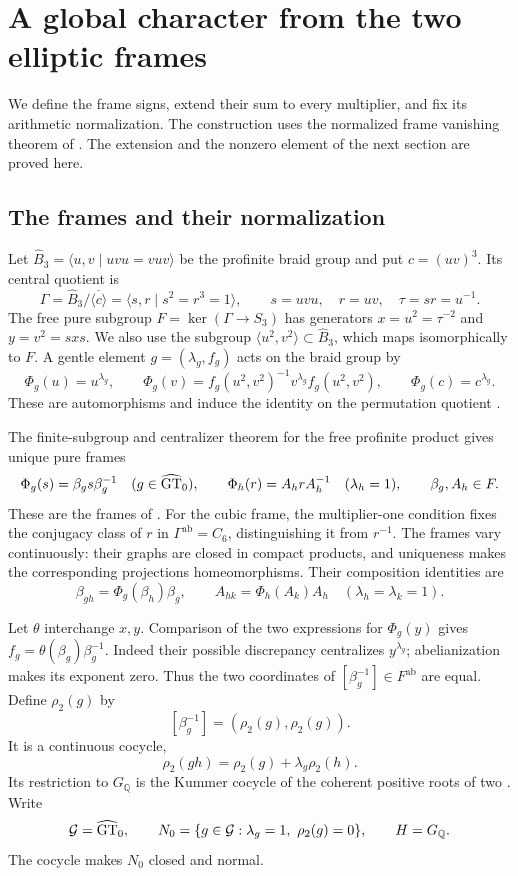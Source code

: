 \section{A global character from the two elliptic frames}
\label{sec:global-frame-character}

We define the frame signs, extend their sum to every multiplier, and
fix its arithmetic normalization. The construction uses the normalized
frame vanishing theorem of \cite[Theorem~3]{H17}. The extension and
the nonzero element of the next section are proved here.

\subsection{The frames and their normalization}

Let $\widehat B_3=\langle u,v\mid uvu=vuv\rangle$ be the profinite
braid group and put $c=(uv)^3$. Its central quotient is
\[
 \Gamma=\widehat B_3/\overline{\langle c\rangle}
      =\langle s,r\mid s^2=r^3=1\rangle,
 \qquad s=uvu,\quad r=uv,\quad \tau=sr=u^{-1}.
\]
The free pure subgroup $F=\ker(\Gamma\to S_3)$ has generators
$x=u^2=\tau^{-2}$ and $y=v^2=sxs$. We also use the subgroup
$\langle u^2,v^2\rangle\subset\widehat B_3$, which maps isomorphically
to $F$. A gentle element $g=(\lambda_g,f_g)$ acts on the braid
group by
\[
 \Phi_g(u)=u^{\lambda_g},\qquad
 \Phi_g(v)=f_g(u^2,v^2)^{-1}v^{\lambda_g}f_g(u^2,v^2),
 \qquad \Phi_g(c)=c^{\lambda_g}.
\]
These are automorphisms and induce the identity on the permutation
quotient \cite[\S1.3]{HS}.

The finite-subgroup and centralizer theorem for the free profinite
product gives unique pure frames
\[
 \Phi_g(s)=\beta_gs\beta_g^{-1}\quad(g\in\widehat{\mathrm{GT}}_0),
 \qquad
 \Phi_h(r)=A_hrA_h^{-1}\quad(\lambda_h=1),
 \qquad \beta_g,A_h\in F.
\]
These are the frames of \cite[Lemma~5]{H17}. For the cubic frame,
the multiplier-one condition fixes the conjugacy class of $r$ in
$\Gamma^{\mathrm{ab}}=C_6$, distinguishing it from $r^{-1}$.
The frames vary continuously: their graphs are closed in compact
products, and uniqueness makes the corresponding projections
homeomorphisms. Their composition identities are
\begin{equation}
 \beta_{gh}=\Phi_g(\beta_h)\beta_g,
 \qquad A_{hk}=\Phi_h(A_k)A_h
       \quad(\lambda_h=\lambda_k=1).
 \label{eq:frame-cocycles}
\end{equation}

Let $\theta$ interchange $x,y$. Comparison of the two expressions
for $\Phi_g(y)$ gives
$f_g=\theta(\beta_g)\beta_g^{-1}$. Indeed their possible discrepancy
centralizes $y^{\lambda_g}$; abelianization makes its exponent zero.
Thus the two coordinates of $[\beta_g^{-1}]\in F^{\mathrm{ab}}$
are equal. Define $\rho_2(g)$ by
\[
 [\beta_g^{-1}]=(\rho_2(g),\rho_2(g)).
\]
It is a continuous cocycle,
\[
 \rho_2(gh)=\rho_2(g)+\lambda_g\rho_2(h).
\]
Its restriction to $G_{\mathbb Q}$ is the Kummer cocycle of the
coherent positive roots of two \cite[Lemma~7]{H17}.
Write
\[
 \mathcal G=\widehat{\mathrm{GT}}_0,\qquad
 N_0=\{g\in\mathcal G:\lambda_g=1,\ \rho_2(g)=0\},
 \qquad H=G_{\mathbb Q}.
\]
The cocycle makes $N_0$ closed and normal.

